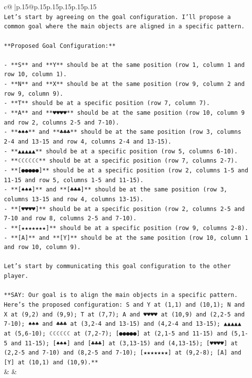 \documentclass{article}
\begin{document}
{\begin{supertabular}{c@{$\;$}|p{.15\linewidth}@{}p{.15\linewidth}p{.15\linewidth}p{.15\linewidth}p{.15\linewidth}p{.15\linewidth}}
{{{\\ 
\texttt{Let's start by agreeing on the goal configuration. I'll propose a common goal where the main objects are aligned in a specific pattern.} \\
\\ 
\texttt{**Proposed Goal Configuration:**} \\
\\ 
\texttt{{-} **S** and **Y** should be at the same position (row 1, column 1 and row 10, column 1).} \\
\texttt{{-} **N** and **X** should be at the same position (row 9, column 2 and row 9, column 9).} \\
\texttt{{-} **T** should be at a specific position (row 7, column 7).} \\
\texttt{{-} **A** and **♥♥♥♥** should be at the same position (row 10, column 9 and row 2, columns 2{-}5 and 7{-}10).} \\
\texttt{{-} **♠♠♠** and **♣♣♣** should be at the same position (row 3, columns 2{-}4 and 13{-}15 and row 4, columns 2{-}4 and 13{-}15).} \\
\texttt{{-} **▲▲▲▲▲** should be at a specific position (row 5, columns 6{-}10).} \\
\texttt{{-} **☾☾☾☾☾☾** should be at a specific position (row 7, columns 2{-}7).} \\
\texttt{{-} **{[}●●●●●{]}** should be at a specific position (row 2, columns 1{-}5 and 11{-}15 and row 5, columns 1{-}5 and 11{-}15).} \\
\texttt{{-} **{[}♠♠♠{]}** and **{[}♣♣♣{]}** should be at the same position (row 3, columns 13{-}15 and row 4, columns 13{-}15).} \\
\texttt{{-} **{[}♥♥♥♥{]}** should be at a specific position (row 2, columns 2{-}5 and 7{-}10 and row 8, columns 2{-}5 and 7{-}10).} \\
\texttt{{-} **{[}★★★★★★★{]}** should be at a specific position (row 9, columns 2{-}8).} \\
\texttt{{-} **{[}A{]}** and **{[}Y{]}** should be at the same position (row 10, column 1 and row 10, column 9).} \\
\\ 
\texttt{Let's start by communicating this goal configuration to the other player.} \\
\\ 
\texttt{**SAY: Our goal is to align the main objects in a specific pattern. Here's the proposed configuration: S and Y at (1,1) and (10,1); N and X at (9,2) and (9,9); T at (7,7); A and ♥♥♥♥ at (10,9) and (2,2{-}5 and 7{-}10); ♠♠♠ and ♣♣♣ at (3,2{-}4 and 13{-}15) and (4,2{-}4 and 13{-}15); ▲▲▲▲▲ at (5,6{-}10); ☾☾☾☾☾☾ at (7,2{-}7); {[}●●●●●{]} at (2,1{-}5 and 11{-}15) and (5,1{-}5 and 11{-}15); {[}♠♠♠{]} and {[}♣♣♣{]} at (3,13{-}15) and (4,13{-}15); {[}♥♥♥♥{]} at (2,2{-}5 and 7{-}10) and (8,2{-}5 and 7{-}10); {[}★★★★★★★{]} at (9,2{-}8); {[}A{]} and {[}Y{]} at (10,1) and (10,9).**} \\
            }
        }
    }
    & & \\ \\


\end{supertabular}}
\end{document}
